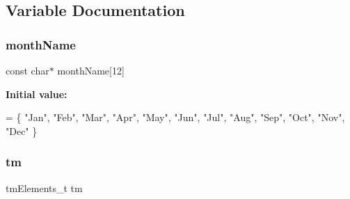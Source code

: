 \subsection{Variable Documentation}
\mbox{\label{_set_time_8ino_a9fce7af8b9842b4ab3b85327b1af13fc}} 
\subsubsection{\texorpdfstring{month\+Name}{monthName}}
{\footnotesize\ttfamily const char$\ast$ month\+Name\mbox{[}12\mbox{]}}

{\bfseries Initial value\+:}
\begin{DoxyCode}
= \{
  \textcolor{stringliteral}{"Jan"}, \textcolor{stringliteral}{"Feb"}, \textcolor{stringliteral}{"Mar"}, \textcolor{stringliteral}{"Apr"}, \textcolor{stringliteral}{"May"}, \textcolor{stringliteral}{"Jun"},
  \textcolor{stringliteral}{"Jul"}, \textcolor{stringliteral}{"Aug"}, \textcolor{stringliteral}{"Sep"}, \textcolor{stringliteral}{"Oct"}, \textcolor{stringliteral}{"Nov"}, \textcolor{stringliteral}{"Dec"}
\}
\end{DoxyCode}
\mbox{\label{_set_time_8ino_a52357cbf68af66972047f7aed7a45218}} 
\subsubsection{\texorpdfstring{tm}{tm}}
{\footnotesize\ttfamily tm\+Elements\+\_\+t tm}

